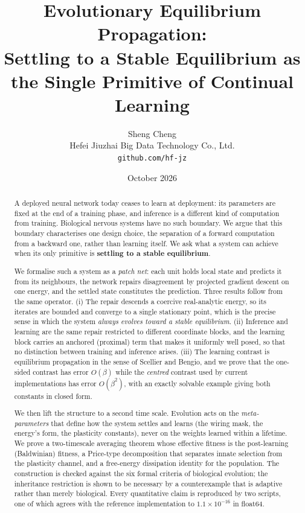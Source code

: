 \documentclass[11pt]{article}
\title{\bfseries Evolutionary Equilibrium Propagation:\\[2pt]
Settling to a Stable Equilibrium as the Single Primitive of Continual Learning}
\author{Sheng Cheng\\ \small Hefei Jiuzhai Big Data Technology Co., Ltd.\\ \small \texttt{github.com/hf-jz}}
\date{October 2026}
\theoremstyle{definition}
\theoremstyle{remark}
\begin{document}
\maketitle

\begin{abstract}
\noindent
A deployed neural network today ceases to learn at deployment: its parameters are fixed at the end of
a training phase, and inference is a different kind of computation from training. Biological nervous
systems have no such boundary. We argue that this boundary characterises one design choice, the
separation of a forward computation from a backward one, rather than learning itself. We ask what a
system can achieve when its only primitive is \textbf{settling to a stable equilibrium}.

We formalise such a system as a \emph{patch net}: each unit holds local state and predicts it from its
neighbours, the network repairs disagreement by projected gradient descent on one energy, and the
settled state constitutes the prediction. Three results follow from the same operator. (i) The repair descends a
coercive real-analytic energy, so its iterates are bounded and converge to a single stationary point,
which is the precise sense in which the system \emph{always evolves toward a stable equilibrium}.
(ii) Inference and learning are the same repair restricted to different coordinate blocks, and the
learning block carries an anchored (proximal) term that makes it uniformly well posed, so that no
distinction between training and inference arises. (iii) The learning contrast is equilibrium propagation in the sense
of Scellier and Bengio, and we prove that the one-sided contrast has error $O(\beta)$ while the
\emph{centred} contrast used by current implementations has error $O(\beta^2)$, with an exactly
solvable example giving both constants in closed form.

We then lift the structure to a second time scale. Evolution acts on the \emph{meta-parameters} that
define how the system settles and learns (the wiring mask, the energy's form, the plasticity constants),
never on the weights learned within a lifetime. We prove a two-timescale averaging theorem whose effective
fitness is the post-learning (Baldwinian) fitness, a Price-type decomposition that separates innate
selection from the plasticity channel, and a free-energy dissipation identity for the population. The
construction is checked against the six formal criteria of biological evolution; the inheritance
restriction is shown to be necessary by a counterexample that is adaptive rather than merely
biological.
Every quantitative claim is reproduced by two scripts, one of which agrees with the reference
implementation to $1.1\times10^{-16}$ in float64.

\end{abstract}
\end{document}
